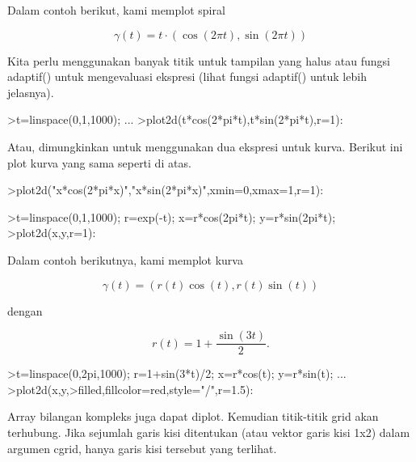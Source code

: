 \documentclass{article}
\begin{document}
\begin{eulernotebook}
\begin{eulercomment}
\begin{eulercomment}
\begin{eulercomment}
\begin{eulercomment}
\begin{eulercomment}
Dalam contoh berikut, kami memplot spiral

\end{eulercomment}
\begin{eulerformula}
\[
\gamma(t) = t \cdot (\cos(2\pi t),\sin(2\pi t))
\]
\end{eulerformula}
\begin{eulercomment}
Kita perlu menggunakan banyak titik untuk tampilan yang halus atau
fungsi adaptif() untuk mengevaluasi ekspresi (lihat fungsi adaptif()
untuk lebih jelasnya).
\end{eulercomment}
\begin{eulerprompt}
>t=linspace(0,1,1000); ...
>plot2d(t*cos(2*pi*t),t*sin(2*pi*t),r=1):
\end{eulerprompt}
\begin{eulercomment}
Atau, dimungkinkan untuk menggunakan dua ekspresi untuk kurva. Berikut
ini plot kurva yang sama seperti di atas.
\end{eulercomment}
\begin{eulerprompt}
>plot2d("x*cos(2*pi*x)","x*sin(2*pi*x)",xmin=0,xmax=1,r=1):
\end{eulerprompt}
\begin{eulerprompt}
>t=linspace(0,1,1000); r=exp(-t); x=r*cos(2pi*t); y=r*sin(2pi*t);
>plot2d(x,y,r=1):
\end{eulerprompt}
\begin{eulercomment}
Dalam contoh berikutnya, kami memplot kurva

\end{eulercomment}
\begin{eulerformula}
\[
\gamma(t) = (r(t) \cos(t), r(t) \sin(t))
\]
\end{eulerformula}
\begin{eulercomment}
dengan

\end{eulercomment}
\begin{eulerformula}
\[
r(t) = 1 + \dfrac{\sin(3t)}{2}.
\]
\end{eulerformula}
\begin{eulerprompt}
>t=linspace(0,2pi,1000); r=1+sin(3*t)/2; x=r*cos(t); y=r*sin(t); ...
>plot2d(x,y,>filled,fillcolor=red,style="/",r=1.5):
\end{eulerprompt}
\begin{eulercomment}
Array bilangan kompleks juga dapat diplot. Kemudian titik-titik grid
akan terhubung. Jika sejumlah garis kisi ditentukan (atau vektor garis
kisi 1x2) dalam argumen cgrid, hanya garis kisi tersebut yang
terlihat.


\end{eulercomment}
\end{eulercomment}
\end{eulercomment}
\end{eulercomment}
\end{eulercomment}
\end{eulernotebook}
\end{document}
